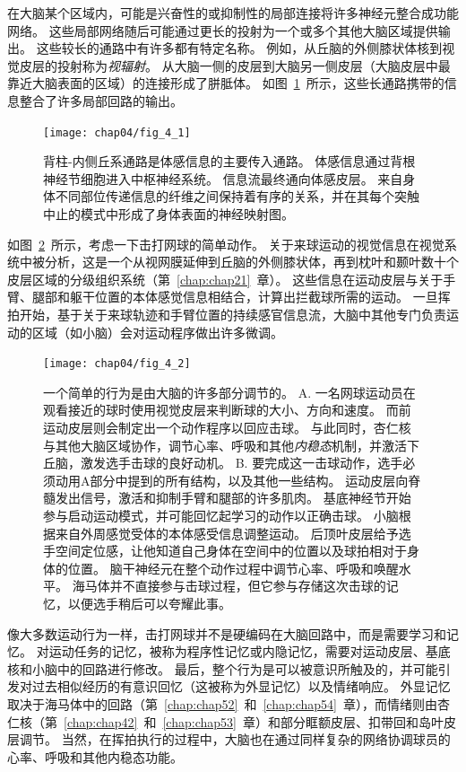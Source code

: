 在大脑某个区域内，可能是兴奋性的或抑制性的局部连接将许多神经元整合成功能网络。
这些局部网络随后可能通过更长的投射为一个或多个其他大脑区域提供输出。
这些较长的通路中有许多都有特定名称。
例如，从丘脑的外侧膝状体核到视觉皮层的投射称为\textit{视辐射}。
从大脑一侧的皮层到大脑另一侧皮层（大脑皮层中最靠近大脑表面的区域）的连接形成了胼胝体。
如图~\ref{fig:4_1}~所示，这些长通路携带的信息整合了许多局部回路的输出。


\begin{figure}[htbp]
	\centering
	\texttt{[image: chap04/fig\_4\_1]}
	\caption{背柱-内侧丘系通路是体感信息的主要传入通路。 
		体感信息通过背根神经节细胞进入中枢神经系统。
		信息流最终通向体感皮层。
		来自身体不同部位传递信息的纤维之间保持着有序的关系，并在其每个突触中止的模式中形成了身体表面的神经映射图。}
	\label{fig:4_1}
\end{figure}


如图~\ref{fig:4_2}~所示，考虑一下击打网球的简单动作。
关于来球运动的视觉信息在视觉系统中被分析，这是一个从视网膜延伸到丘脑的外侧膝状体，再到枕叶和颞叶数十个皮层区域的分级组织系统（第~\ref{chap:chap21}~章）。
这些信息在运动皮层与关于手臂、腿部和躯干位置的本体感觉信息相结合，计算出拦截球所需的运动。 
一旦挥拍开始，基于关于来球轨迹和手臂位置的持续感官信息流，大脑中其他专门负责运动的区域（如小脑）会对运动程序做出许多微调。


\begin{figure}[htbp]
	\centering
	\texttt{[image: chap04/fig\_4\_2]}
	\caption{一个简单的行为是由大脑的许多部分调节的。 
		A. 一名网球运动员在观看接近的球时使用视觉皮层来判断球的大小、方向和速度。 
		而前运动皮层则会制定出一个动作程序以回应击球。
		与此同时，杏仁核与其他大脑区域协作，调节心率、呼吸和其他\textit{内稳态}机制，并激活下丘脑，激发选手击球的良好动机。 
		B. 要完成这一击球动作，选手必须动用A部分中提到的所有结构，以及其他一些结构。
		运动皮层向脊髓发出信号，激活和抑制手臂和腿部的许多肌肉。
		基底神经节开始参与启动运动模式，并可能回忆起学习的动作以正确击球。
		小脑根据来自外周感觉受体的本体感受信息调整运动。
		后顶叶皮层给予选手空间定位感，让他知道自己身体在空间中的位置以及球拍相对于身体的位置。
		脑干神经元在整个动作过程中调节心率、呼吸和唤醒水平。
		海马体并不直接参与击球过程，但它参与存储这次击球的记忆，以便选手稍后可以夸耀此事。}
	\label{fig:4_2}
\end{figure}


像大多数运动行为一样，击打网球并不是硬编码在大脑回路中，而是需要学习和记忆。
对运动任务的记忆，被称为程序性记忆或内隐记忆，需要对运动皮层、基底核和小脑中的回路进行修改。
最后，整个行为是可以被意识所触及的，并可能引发对过去相似经历的有意识回忆（这被称为外显记忆）以及情绪响应。
外显记忆取决于海马体中的回路（第~\ref{chap:chap52}~和~\ref{chap:chap54}~章），而情绪则由杏仁核（第~\ref{chap:chap42}~和~\ref{chap:chap53}~章）和部分眶额皮层、扣带回和岛叶皮层调节。
当然，在挥拍执行的过程中，大脑也在通过同样复杂的网络协调球员的心率、呼吸和其他内稳态功能。



